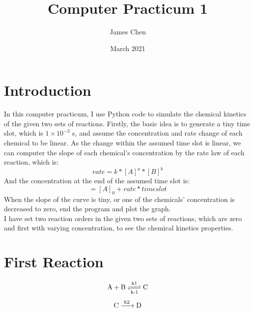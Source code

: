 \documentclass{article}
\title{Computer Practicum 1}
\author{James Chen}
\date{March 2021}
\begin{document}
\maketitle
\section{Introduction}
In this computer practicum, I use Python code to simulate the chemical kinetics of the given two sets of reactions. Firstly, the basic idea is to generate a tiny time slot, which is $1 \times 10^{-3}$ s, and assume the concentration and rate change of each chemical to be linear. As the change within the assumed time slot is linear, we can computer the slope of each chemical's concentration by the rate law of each reaction, which is:
\begin{equation}
    rate = k * [A]^a * [B]^b
\end{equation}
And the concentration at the end of the assumed time slot is:
\begin{equation}
    [A] = [A]_0 + rate * time slot
\end{equation}
When the slope of the curve is tiny, or one of the chemicals' concentration is decreased to zero, end the program and plot the graph.\\
I have set two reaction orders in the given two sets of reactions, which are zero and first with varying concentration, to see the chemical kinetics properties.
\section{First Reaction}
\begin{equation}
    \ce{A + B <=>T[k1][k-1] C}
\end{equation}
\begin{equation}
    \ce{C ->T[k2] D}
\end{equation}
\end{document}
